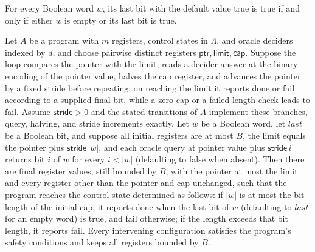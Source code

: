 \begin{theorem}
\label{Complexity.LogProg.drop_canon}
\leanok
{}
For every Boolean word $w$, its last bit with the default value true is true if and only
if either $w$ is empty or its last bit is true.
\end{theorem}

\begin{theorem}
\label{Complexity.LogProg.canonicalTail_loop}
\leanok
{}
Let $A$ be a program with $m$ registers, control states in $\Lambda$, and oracle
deciders indexed by $d$, and choose pairwise distinct registers
$\mathsf{ptr},\mathsf{limit},\mathsf{cap}$. Suppose the loop compares the pointer with
the limit, reads a decider answer at the binary encoding of the pointer value, halves
the cap register, and advances the pointer by a fixed stride before repeating; on
reaching the limit it reports done or fail according to a supplied final bit, while a
zero cap or a failed length check leads to fail. Assume $\mathsf{stride}>0$ and the
stated transitions of $A$ implement these branches, query, halving, and stride
increments exactly. Let $w$ be a Boolean word, let $\mathit{last}$ be a Boolean bit, and
suppose all initial registers are at most $B$, the limit equals the pointer plus
$\mathsf{stride}\,|w|$, and each oracle query at pointer value plus $\mathsf{stride}\,i$
returns bit $i$ of $w$ for every $i<|w|$ (defaulting to false when absent). Then there
are final register values, still bounded by $B$, with the pointer at most the limit and
every register other than the pointer and cap unchanged, such that the program reaches
the control state determined as follows: if $|w|$ is at most the bit length of the
initial cap, it reports done when the last bit of $w$ (defaulting to $\mathit{last}$ for
an empty word) is true, and fail otherwise; if the length exceeds that bit length, it
reports fail. Every intervening configuration satisfies the program’s safety conditions
and keeps all registers bounded by $B$.
\end{theorem}

